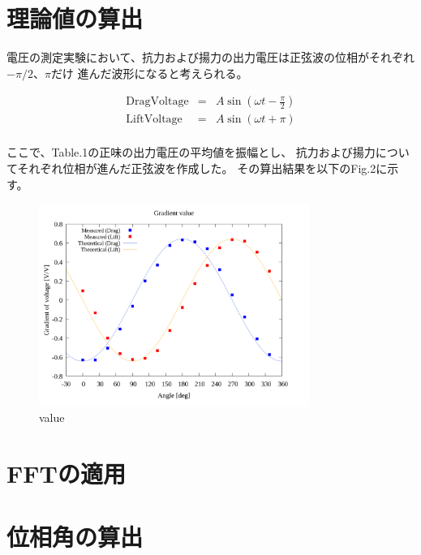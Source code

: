 \documentclass[twocolumn,a4j]{jsarticle}
\begin{document}
\section{理論値の算出}
電圧の測定実験において、抗力および揚力の出力電圧は正弦波の位相がそれぞれ$-\pi/2$、$\pi$だけ
進んだ波形になると考えられる。

\begin{eqnarray*}
    \mathrm{Drag Voltage} &=& A \sin\left(\omega t - \frac{\pi}{2}\right)\\
    \mathrm{Lift Voltage} &=& A \sin\left(\omega t + \pi\right)\\        
\end{eqnarray*}

ここで、Table.1の正味の出力電圧の平均値を振幅とし、
抗力および揚力についてそれぞれ位相が進んだ正弦波を作成した。
その算出結果を以下のFig.2に示す。

\begin{figure}[htbp]
    \footnotesize
    \begin{center}
        \includegraphics[width=88mm]{../images_2/20/20_adjust-value.png}
        \caption{value}
    \end{center}
\end{figure}

\section{FFTの適用}

\section{位相角の算出}
\end{document}
